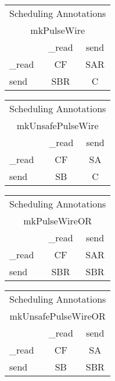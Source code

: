 \begin{center}
\begin{tabular}{|p{.75 in}|c|c|}
\hline
\multicolumn{3}{|c|}{Scheduling Annotations}\\
\multicolumn{3}{|c|}{mkPulseWire}\\
\hline
&{\_read}&{send}\\
\hline
\hline
{\_read}&CF&SAR\\
\hline
{send}&SBR& C\\
\hline
\hline
\end{tabular}
\hmm\begin{tabular}{|p{.75 in}|c|c|}
\hline
\multicolumn{3}{|c|}{Scheduling Annotations}\\
\multicolumn{3}{|c|}{mkUnsafePulseWire}\\
\hline
&{\_read}&{send}\\
\hline
\hline
{\_read}&CF&SA\\
\hline
{send}&SB& C\\
\hline
\hline
\end{tabular}
\end{center}

\begin{center}
\begin{tabular}{|p{.75 in}|c|c|}
\hline
\multicolumn{3}{|c|}{Scheduling Annotations}\\
\multicolumn{3}{|c|}{mkPulseWireOR}\\
\hline
&{\_read}&{send}\\
\hline
\hline
{\_read}&CF&SAR\\
\hline
{send}&SBR&SBR\\
\hline
\hline
\end{tabular}
\hmm\begin{tabular}{|p{.75 in}|c|c|}
\hline
\multicolumn{3}{|c|}{Scheduling Annotations}\\
\multicolumn{3}{|c|}{mkUnsafePulseWireOR}\\
\hline
&{\_read}&{send}\\
\hline
\hline
{\_read}&CF&SA\\
\hline
{send}&SB&SBR\\
\hline
\hline
\end{tabular}
\end{center}



